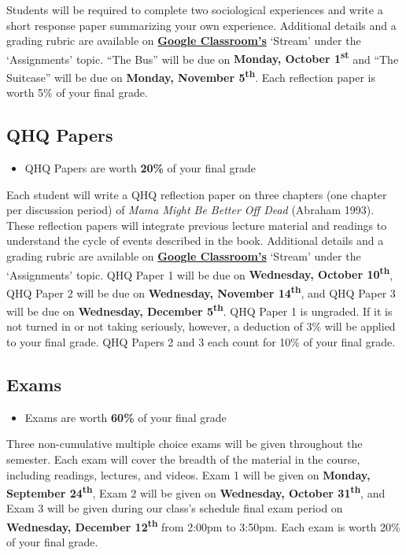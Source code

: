 \documentclass[]{book}
\newenvironment{rmdblock}[1]
  {\begin{shaded*}
  \begin{itemize}
  \renewcommand{\labelitemi}{
    \raisebox{-.7\height}[0pt][0pt]{
      {\setkeys{Gin}{width=3em,keepaspectratio}\texttt{[image: images/\#1]}}
    }
  }
  \item
  }
  {
  \end{itemize}
  \end{shaded*}
  }
\newenvironment{rmdtip}
  {\begin{rmdblock}{tip}}
  {\end{rmdblock}}
\theoremstyle{definition}
\theoremstyle{definition}
\theoremstyle{definition}
\theoremstyle{remark}
\begin{document}
Students will be required to complete two sociological experiences and
write a short response paper summarizing your own experience. Additional
details and a grading rubric are available on
\textbf{\href{https://classroom.google.com}{Google Classroom's}}
`Stream' under the `Assignments' topic. ``The Bus'' will be due on
\textbf{Monday, October 1\textsuperscript{st}} and ``The Suitcase'' will
be due on \textbf{Monday, November 5\textsuperscript{th}}. Each
reflection paper is worth 5\% of your final grade.

\hypertarget{qhq-papers}{%
\subsection{QHQ Papers}\label{qhq-papers}}

\begin{rmdtip}
QHQ Papers are worth \textbf{20\%} of your final grade
\end{rmdtip}

Each student will write a QHQ reflection paper on three chapters (one
chapter per discussion period) of \emph{Mama Might Be Better Off Dead}
(Abraham 1993). These reflection papers will integrate previous lecture
material and readings to understand the cycle of events described in the
book. Additional details and a grading rubric are available on
\textbf{\href{https://classroom.google.com}{Google Classroom's}}
`Stream' under the `Assignments' topic. QHQ Paper 1 will be due on
\textbf{Wednesday, October 10\textsuperscript{th}}, QHQ Paper 2 will be
due on \textbf{Wednesday, November 14\textsuperscript{th}}, and QHQ
Paper 3 will be due on \textbf{Wednesday, December
5\textsuperscript{th}}. QHQ Paper 1 is ungraded. If it is not turned in
or not taking seriously, however, a deduction of 3\% will be applied to
your final grade. QHQ Papers 2 and 3 each count for 10\% of your final
grade.

\hypertarget{exams}{%
\subsection{Exams}\label{exams}}

\begin{rmdtip}
Exams are worth \textbf{60\%} of your final grade
\end{rmdtip}

Three non-cumulative multiple choice exams will be given throughout the
semester. Each exam will cover the breadth of the material in the
course, including readings, lectures, and videos. Exam 1 will be given
on \textbf{Monday, September 24\textsuperscript{th}}, Exam 2 will be
given on \textbf{Wednesday, October 31\textsuperscript{th}}, and Exam 3
will be given during our class's schedule final exam period on
\textbf{Wednesday, December 12\textsuperscript{th}} from 2:00pm to
3:50pm. Each exam is worth 20\% of your final grade.
\end{document}
